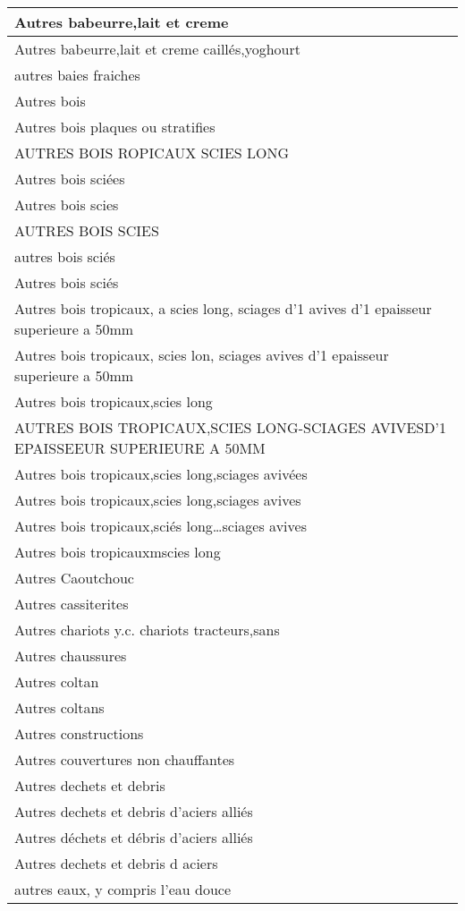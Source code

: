 \documentclass[
]{book}
\begin{document}
\begin{table}
\begin{tabular}[t]{l}
\hline
Autres babeurre,lait et creme\\
\hline
Autres babeurre,lait et creme caillés,yoghourt\\
\hline
autres baies fraiches\\
\hline
Autres bois\\
\hline
Autres bois plaques ou stratifies\\
\hline
AUTRES BOIS ROPICAUX SCIES LONG\\
\hline
Autres bois sciées\\
\hline
Autres bois scies\\
\hline
AUTRES BOIS SCIES\\
\hline
autres bois sciés\\
\hline
Autres bois sciés\\
\hline
Autres bois tropicaux, a scies long, sciages d'1 avives d'1 epaisseur superieure a 50mm\\
\hline
Autres bois tropicaux, scies lon, sciages avives d'1 epaisseur superieure a 50mm\\
\hline
Autres bois tropicaux,scies long\\
\hline
AUTRES BOIS TROPICAUX,SCIES LONG-SCIAGES AVIVESD'1 EPAISSEEUR SUPERIEURE A 50MM\\
\hline
Autres bois tropicaux,scies long,sciages avivées\\
\hline
Autres bois tropicaux,scies long,sciages avives\\
\hline
Autres bois tropicaux,sciés long…sciages avives\\
\hline
Autres bois tropicauxmscies long\\
\hline
Autres Caoutchouc\\
\hline
Autres cassiterites\\
\hline
Autres chariots y.c. chariots tracteurs,sans\\
\hline
Autres chaussures\\
\hline
Autres coltan\\
\hline
Autres coltans\\
\hline
Autres constructions\\
\hline
Autres couvertures non chauffantes\\
\hline
Autres dechets et debris\\
\hline
Autres dechets et debris d'aciers alliés\\
\hline
Autres déchets et débris d'aciers alliés\\
\hline
Autres dechets et debris d aciers\\
\hline
autres eaux, y compris l'eau douce\\

\end{tabular}
\end{table}
\end{document}
